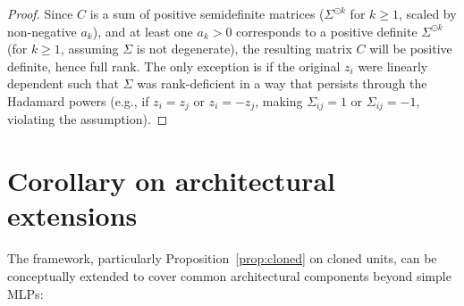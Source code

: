 \documentclass{article}
\begin{document}
\begin{proof}
    Since $C$ is a sum of positive semidefinite matrices ($\Sigma^{\odot k}$ for $k \ge 1$, scaled by non-negative $a_k$), and at least one $a_k > 0$ corresponds to a positive definite $\Sigma^{\odot k}$ (for $k \ge 1$, assuming $\Sigma$ is not degenerate), the resulting matrix $C$ will be positive definite, hence full rank. The only exception is if the original $z_i$ were linearly dependent such that $\Sigma$ was rank-deficient in a way that persists through the Hadamard powers (e.g., if $z_i = z_j$ or $z_i = -z_j$, making $\Sigma_{ij}=1$ or $\Sigma_{ij}=-1$, violating the assumption).
\end{proof}


\section{Corollary on architectural extensions}
The framework, particularly Proposition~\ref{prop:cloned} on cloned units, can be conceptually extended to cover common architectural components beyond simple MLPs:
\end{document}
